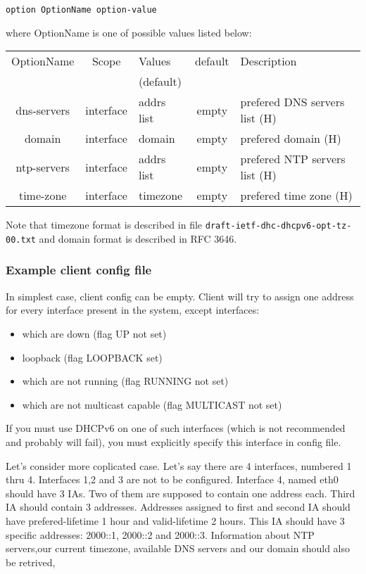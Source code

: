 \begin{verbatim}
option OptionName option-value
\end{verbatim}

where OptionName is one of possible values listed below:

\begin{center}
\begin{tabular}{|c|c|>{\centering}p{1.7cm}<{}|c|p{6cm}|}
\hline
OptionName     & Scope    & Values      &default& Description \\
               &          & (default)   &       & \\
\hline
dns-servers    & interface& addrs list  & empty & prefered DNS servers list (H) \\
domain         & interface& domain      & empty & prefered domain (H)\\
ntp-servers    & interface& addrs list  & empty & prefered NTP servers list (H)\\
time-zone      & interface& timezone    & empty & prefered time zone (H)\\
\hline
\end{tabular}
\end{center}

Note that timezone format is described in file \verb+draft-ietf-dhc-dhcpv6-opt-tz-00.txt+
and domain format is described in RFC 3646.

\subsubsection{Example client config file}

In simplest case, client config can be empty. Client will try to
assign one address for every interface present in the system, except
interfaces:
\begin{itemize}
\item which are down (flag UP not set)
\item loopback (flag LOOPBACK set)
\item which are not running (flag RUNNING not set)
\item which are not multicast capable (flag MULTICAST not set)
\end{itemize}

If you must use DHCPv6 on one of such interfaces (which is not
recommended and probably will fail), you must explicitly specify this
interface in config file.

Let's consider more coplicated case. Let's say there are 4 interfaces,
numbered 1 thru 4. Interfaces 1,2 and 3 are not to be
configured. Interface 4, named eth0 should have 3 IAs. Two of them are
supposed to contain one address each. Third IA should contain 3
addresses. Addresses assigned to first and second IA should have
prefered-lifetime 1 hour and valid-lifetime 2 hours. This IA should
have 3 specific addresses: 2000::1, 2000::2 and 2000::3. Information
about NTP servers,our current timezone, available DNS servers and our
domain should also be retrived,

